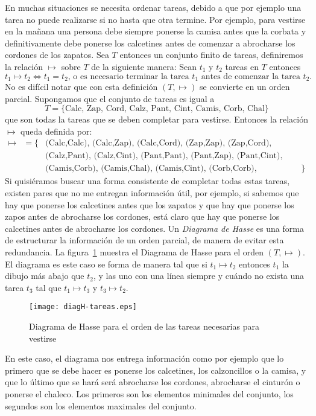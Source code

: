 \begin{ejemplo}
En muchas situaciones se necesita ordenar tareas, debido a que por ejemplo una tarea no puede realizarse si no hasta que otra termine.
Por ejemplo, para vestirse en la mañana una persona debe siempre ponerse la camisa antes que la corbata y definitivamente debe ponerse los calcetines antes de comenzar a abrocharse los cordones de los zapatos.
Sea $T$ entonces un conjunto finito de tareas, definiremos la relación $\mapsto$ sobre $T$ de la siguiente manera:
Sean $t_1$ y $t_2$ tareas en $T$ entonces
\[
t_1\mapsto t_2\Leftrightarrow t_1=t_2\text{, o es necesario terminar la tarea }t_1\text{ antes de comenzar la tarea }t_2.
\]
No es difícil notar que con esta definición $(T,\mapsto)$ se convierte en un orden parcial.
Supongamos que el conjunto de tareas es igual a 
\[
T=\{\text{Calc, Zap, Cord, Calz, Pant, Cint, Camis, Corb, Chal}
\}
\] 
que son todas la tareas que se deben completar para vestirse.
Entonces la relación $\mapsto$ queda definida por:
\[
\begin{array}{rcll}
\mapsto& = \{& \text{(Calc,Calc), (Calc,Zap), (Calc,Cord), (Zap,Zap), (Zap,Cord),(Cord, Cord), (Calz,Calz),} \\ 
& & \text{(Calz,Pant), (Calz,Cint), (Pant,Pant), (Pant,Zap), (Pant,Cint), (Camis, Camis),} \\
& & \text{(Camis,Corb), (Camis,Chal), (Camis,Cint), (Corb,Corb), (Corb,Chal), (Chal,Chal)} & \}
\end{array}
\]
Si quisiéramos buscar una forma consistente de completar todas estas tareas, existen pares que no me entregan información útil, por ejemplo, si sabemos que hay que ponerse los calcetines antes que los zapatos y que hay que ponerse los zapos antes de abrocharse los cordones, está claro que hay que ponerse los calcetines antes de abrocharse los cordones.
Un \emph{Diagrama de Hasse} es una forma de estructurar la información de un orden parcial, de manera de evitar esta redundancia.
La figura~\ref{fig:diagH-tareas} muestra el Diagrama de Hasse para el orden $(T,\mapsto)$.
El diagrama es este caso se forma de manera tal que si $t_1\mapsto t_2$ entonces $t_1$ la dibujo más abajo que $t_2$, y las uno con una línea siempre y cuándo no exista una tarea $t_3$ tal que $t_1\mapsto t_3$ y $t_3\mapsto t_2$.

\begin{figure}[h!]
\centering
\texttt{[image: diagH-tareas.eps]}
\caption{Diagrama de Hasse para el orden de las tareas necesarias para vestirse}
\label{fig:diagH-tareas}
\end{figure}

En este caso, el diagrama nos entrega información como por ejemplo que lo primero que se debe hacer es ponerse los calcetines, los calzoncillos o la camisa, y que lo último que se hará será abrocharse los cordones, abrocharse el cinturón o ponerse el chaleco.
Los primeros son los elementos minimales del conjunto, los segundos son los elementos maximales del conjunto.
\end{ejemplo}


